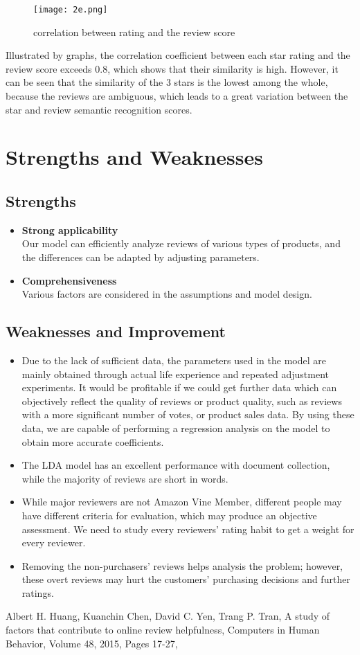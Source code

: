 \documentclass{mcmthesis}
\begin{document}
\begin{figure}[h]
  \small
  \centering
  \texttt{[image: 2e.png]}
  \caption{correlation between rating and the review score}
\end{figure}

Illustrated by graphs, the correlation coefficient between each star rating and the review score exceeds 0.8, which shows that their similarity is high. However, it can be seen that the similarity of the 3 stars is the lowest among the whole, because the reviews are ambiguous, which leads to a great variation between the star and review semantic recognition scores.

\section{ Strengths and Weaknesses }
\subsection{Strengths}
\begin{itemize}
  \item \textbf{Strong applicability}\\
   Our model can efficiently analyze reviews of various types of products, and the differences can be adapted by adjusting parameters.
  \item \textbf{Comprehensiveness}\\
  Various factors are considered in the assumptions and model design.
\end{itemize}

\subsection{Weaknesses and Improvement}
\begin{itemize}
  \item Due to the lack of sufficient data, the parameters used in the model are mainly obtained through actual life experience and repeated adjustment experiments. It would be profitable if we could get further data which can objectively reflect the quality of reviews or product quality, such as reviews with a more significant number of votes, or product sales data. By using these data, we are capable of performing a regression analysis on the model to obtain more accurate coefficients.
  \item The LDA model has an excellent performance with document collection, while the majority of reviews are short in words. 
  \item While major reviewers are not Amazon Vine Member, different people may have different criteria for evaluation, which may produce an objective assessment. We need to study every reviewers' rating habit to get a weight for every reviewer.
  \item Removing the non-purchasers' reviews helps analysis the problem; however, these overt reviews may hurt the customers' purchasing decisions and further ratings.
\end{itemize}

\begin{thebibliography}{99}
   Albert H. Huang, Kuanchin Chen, David C. Yen, Trang P. Tran,
  A study of factors that contribute to online review helpfulness,
  Computers in Human Behavior, Volume 48, 2015, Pages 17-27,
\end{thebibliography}
\end{document}
